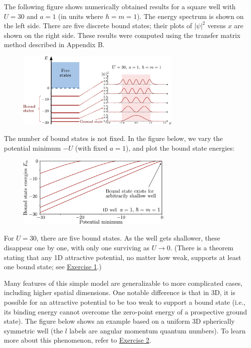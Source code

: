 \documentclass[pra,12pt]{revtex4-2}
\begin{document}
The following figure shows numerically obtained results for a square
well with $U = 30$ and $a=1$ (in units where $\hbar = m =1$).  The
energy spectrum is shown on the left side.  There are five discrete
bound states; their plots of $|\psi|^2$ versus $x$ are shown on the
right side.  These results were computed using the transfer matrix
method described in Appendix B.

\begin{figure}[h]
  \centering\includegraphics[width=0.72\textwidth]{boundvsextended}
\end{figure}

\clearpage
The number of bound states is not fixed.  In the figure below, we vary
the potential minimum $-U$ (with fixed $a = 1$), and plot the bound
state energies:

\vskip 0.15in
\begin{figure}[h]
  \centering\includegraphics[width=0.68\textwidth]{boundstate1d}
\end{figure}

\noindent
For $U = 30$, there are five bound states.  As the well gets
shallower, these disappear one by one, with only one surviving as $U
\rightarrow 0$.  (There is a theorem stating that any 1D attractive
potential, no matter how weak, supports at least one bound state; see
\hyperref[ex:boundstate]{Exercise 1}.)

Many features of this simple model are generalizable to more
complicated cases, including higher spatial dimensions.  One notable
difference is that in 3D, it is possible for an attractive potential
to be too weak to support a bound state (i.e., its binding energy
cannot overcome the zero-point energy of a prospective ground state).
The figure below shows an example based on a uniform 3D spherically
symmetric well (the $l$ labels are angular momentum quantum numbers).
To learn more about this phenomenon, refer to
\hyperref[ex:boundstate3d]{Exercise 2}.
\end{document}
